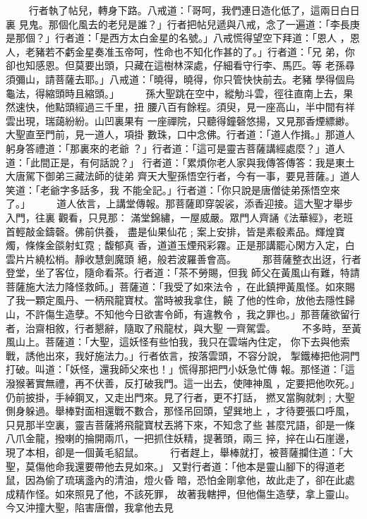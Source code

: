 \begin{pinyinscope}
{　　
行者執了帖兒，轉身下路。八戒道：「哥呵，我們連日造化低了，這兩日白日裏
見鬼。那個化風去的老兒是誰？」行者把帖兒遞與八戒，念了一遍道：「李長庚
是那個？」行者道：「是西方太白金星的名號。」八戒慌得望空下拜道：「恩人
，恩人，老豬若不虧金星奏准玉帝呵，性命也不知化作甚的了。」行者道：「兄
弟，你卻也知感恩。但莫要出頭，只藏在這樹林深處，仔細看守行李、馬匹。等
老孫尋須彌山，請菩薩去耶。」八戒道：「曉得，曉得，你只管快快前去。老豬
學得個烏龜法，得縮頭時且縮頭。」
　　
孫大聖跳在空中，縱觔斗雲，徑往直南上去，果然速快，他點頭經過三千里，扭
腰八百有餘程。須臾，見一座高山，半中間有祥雲出現，瑞藹紛紛。山凹裏果有
一座禪院，只聽得鐘磬悠揚，又見那香煙縹緲。大聖直至門前，見一道人，項掛
數珠，口中念佛。行者道：「道人作揖。」那道人躬身答禮道：「那裏來的老爺
？」行者道：「這可是靈吉菩薩講經處麼？」道人道：「此間正是，有何話說？」
行者道：「累煩你老人家與我傳答傳答：我是東土大唐駕下御弟三藏法師的徒弟
齊天大聖孫悟空行者，今有一事，要見菩薩。」道人笑道：「老爺字多話多，我
不能全記。」行者道：「你只說是唐僧徒弟孫悟空來了。」
　　
道人依言，上講堂傳報。那菩薩即穿袈裟，添香迎接。這大聖才舉步入門，往裏
觀看，只見那：
滿堂錦繡，一屋威嚴。眾門人齊誦《法華經》，老班首輕敲金鑄磬。佛前供養，
盡是仙果仙花﹔案上安排，皆是素殽素品。輝煌寶燭，條條金燄射虹霓﹔馥郁真
香，道道玉煙飛彩霧。正是那講罷心閑方入定，白雲片片繞松梢。靜收慧劍魔頭
絕，般若波羅善會高。
　　
那菩薩整衣出迓，行者登堂，坐了客位，隨命看茶。行者道：「茶不勞賜，但我
師父在黃風山有難，特請菩薩施大法力降怪救師。」菩薩道：「我受了如來法令
，在此鎮押黃風怪。如來賜了我一顆定風丹、一柄飛龍寶杖。當時被我拿住，饒
了他的性命，放他去隱性歸山，不許傷生造孽。不知他今日欲害令師，有違教令
，我之罪也。」那菩薩欲留行者，治齋相敘，行者懇辭，隨取了飛龍杖，與大聖
一齊駕雲。
　　
不多時，至黃風山上。菩薩道：「大聖，這妖怪有些怕我，我只在雲端內住定，
你下去與他索戰，誘他出來，我好施法力。」行者依言，按落雲頭，不容分說，
掣鐵棒把他洞門打破。叫道：「妖怪，還我師父來也！」慌得那把門小妖急忙傳
報。那怪道：「這潑猴著實無禮，再不伏善，反打破我門。這一出去，使陣神風
，定要把他吹死。」仍前披掛，手綽鋼叉，又走出門來。見了行者，更不打話，
撚叉當胸就刺﹔大聖側身躲過。舉棒對面相還戰不數合，那怪吊回頭，望巽地上
，才待要張口呼風，只見那半空裏，靈吉菩薩將飛龍寶杖丟將下來，不知念了些
甚麼咒語，卻是一條八爪金龍，撥喇的掄開兩爪，一把抓住妖精，提著頭，兩三
捽，捽在山石崖邊，現了本相，卻是一個黃毛貂鼠。
　　
行者趕上，舉棒就打，被菩薩攔住道：「大聖，莫傷他命我還要帶他去見如來。」
又對行者道：「他本是靈山腳下的得道老鼠，因為偷了琉璃盞內的清油，燈火昏
暗，恐怕金剛拿他，故此走了，卻在此處成精作怪。如來照見了他，不該死罪，
故著我轄押，但他傷生造孽，拿上靈山。今又沖撞大聖，陷害唐僧，我拿他去見
}
\end{pinyinscope}
